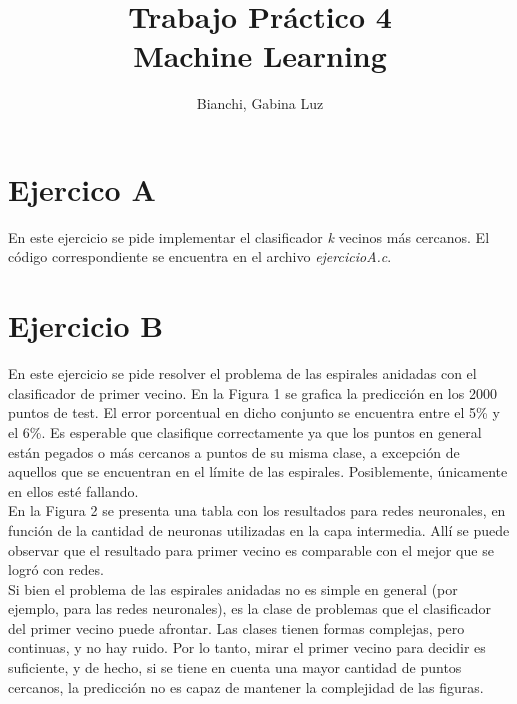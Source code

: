 \documentclass[12pt, a4paper]{article}
\begin{document}
 
\title{Trabajo Práctico 4\\ Machine Learning} 
\author{Bianchi, Gabina Luz} 
\maketitle

\section*{Ejercico A}
En este ejercicio se pide implementar el clasificador \textit{k} vecinos más cercanos. El código correspondiente se encuentra en el archivo \textit{ejercicioA.c}.

\section*{Ejercicio B}
 
En este ejercicio se pide resolver el problema de las espirales anidadas con el clasificador de primer vecino. En la Figura 1 se grafica la predicción en los 2000 puntos de test. El error porcentual en dicho conjunto se encuentra entre el 5\% y el 6\%. Es esperable que clasifique correctamente ya que los puntos en general están pegados o más cercanos a puntos de su misma clase, a excepción de aquellos que se encuentran en el límite de las espirales. Posiblemente, únicamente en ellos esté fallando.\\
En la Figura 2 se presenta una tabla con los resultados para redes neuronales, en función de la cantidad de neuronas utilizadas en la capa intermedia. Allí se puede observar que el resultado para primer vecino es comparable con el mejor que se logró con redes. \\
Si bien el problema de las espirales anidadas no es simple en general (por ejemplo, para las redes neuronales), es la clase de problemas que el clasificador del primer vecino puede afrontar. Las clases tienen formas complejas, pero continuas, y no hay ruido. Por lo tanto, mirar el primer vecino para decidir es suficiente, y de hecho, si se tiene en cuenta una mayor cantidad de puntos cercanos, la predicción no es capaz de mantener la complejidad de las figuras.
 
\end{document}
